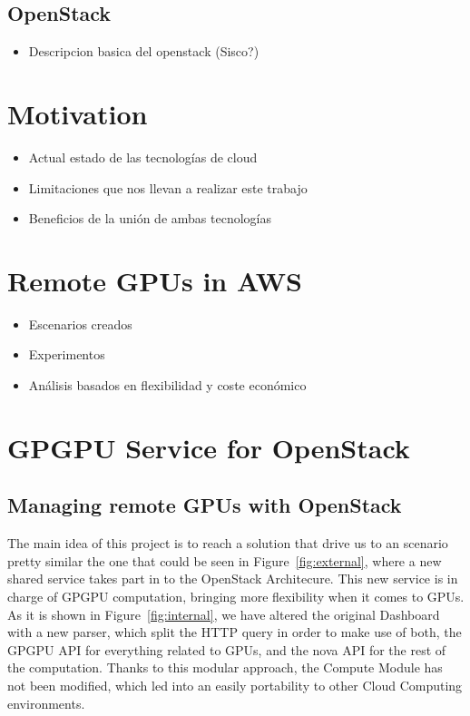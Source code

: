 \documentclass[a4paper,twoside]{article}
\begin{document}
\subsection{OpenStack}
\label{sec:openstack}
\begin{itemize}
\item Descripcion basica del openstack (Sisco?)
\end{itemize}

\section{Motivation}
\label{sec:motivation}

\begin{itemize}
\item Actual estado de las tecnolog\'ias de cloud
\item Limitaciones que nos llevan a realizar este trabajo
\item Beneficios de la unión de ambas tecnolog\'ias
\end{itemize}


\section{Remote GPUs in AWS}
\label{sec:rgpuaws}

\begin{itemize}
\item Escenarios creados
\item Experimentos
\item An\'alisis basados en flexibilidad y coste econ\'omico
\end{itemize}

\section{GPGPU Service for OpenStack}
\subsection{Managing remote GPUs with OpenStack}
The main idea of this project is to reach a solution that drive us to an scenario pretty similar the one that could be seen in Figure~\ref{fig:external}, where a new shared service takes part in to the OpenStack Architecure.
This new service is in charge of GPGPU computation, bringing more flexibility when it comes to GPUs.
As it is shown in Figure~\ref{fig:internal}, we have altered the original Dashboard with a new parser, 
which split the HTTP query in order to make use of both, the GPGPU API for everything related to GPUs, and the nova API for the rest of the computation. 
Thanks to this modular approach, the Compute Module has not been modified, which led into an easily portability to other Cloud Computing environments.
\end{document}
